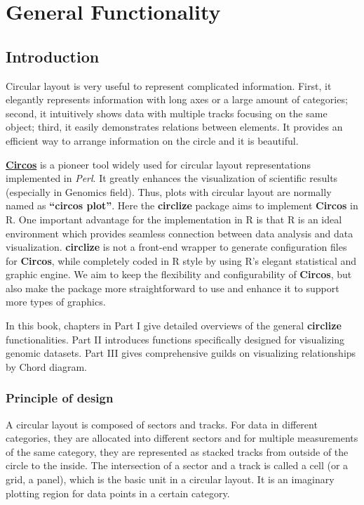 \documentclass[]{book}
\theoremstyle{definition}
\theoremstyle{definition}
\theoremstyle{remark}
\begin{document}
\part{General
Functionality}\label{part-general-functionality}

\chapter{Introduction}\label{introduction}

Circular layout is very useful to represent complicated information.
First, it elegantly represents information with long axes or a large
amount of categories; second, it intuitively shows data with multiple
tracks focusing on the same object; third, it easily demonstrates
relations between elements. It provides an efficient way to arrange
information on the circle and it is beautiful.

\href{http://circos.ca}{\textbf{Circos}} is a pioneer tool widely used
for circular layout representations implemented in \emph{Perl}. It
greatly enhances the visualization of scientific results (especially in
Genomics field). Thus, plots with circular layout are normally named as
\textbf{``circos plot''}. Here the \textbf{circlize} package aims to
implement \textbf{Circos} in R. One important advantage for the
implementation in R is that R is an ideal environment which provides
seamless connection between data analysis and data visualization.
\textbf{circlize} is not a front-end wrapper to generate configuration
files for \textbf{Circos}, while completely coded in R style by using
R's elegant statistical and graphic engine. We aim to keep the
flexibility and configurability of \textbf{Circos}, but also make the
package more straightforward to use and enhance it to support more types
of graphics.

In this book, chapters in Part I give detailed overviews of the general
\textbf{circlize} functionalities. Part II introduces functions
specifically designed for visualizing genomic datasets. Part III gives
comprehensive guilds on visualizing relationships by Chord diagram.

\section{Principle of design}\label{principle-of-design}

A circular layout is composed of sectors and tracks. For data in
different categories, they are allocated into different sectors and for
multiple measurements of the same category, they are represented as
stacked tracks from outside of the circle to the inside. The
intersection of a sector and a track is called a cell (or a grid, a
panel), which is the basic unit in a circular layout. It is an imaginary
plotting region for data points in a certain category.
\end{document}
